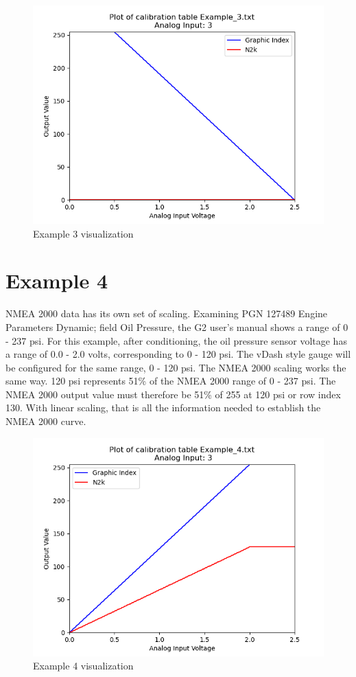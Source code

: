 \documentclass[12pt, letterpaper, twoside, titlepage]{article}
\begin{document}
\begin{figure}[hbt!]
  \includegraphics[width=\linewidth]{Example_3.txt.png}
  \centering
  \caption{Example 3 visualization}
  \label{fig:Example_3}
\end{figure}

\section{Example 4}
 NMEA 2000 data has its own set of scaling.  Examining PGN 127489 Engine Parameters Dynamic;  field Oil Pressure, the G2 user’s manual shows a range of 0 - 237 psi.  For this example,  after conditioning, the oil pressure sensor voltage has a range of 0.0 - 2.0 volts, corresponding to 0 - 120 psi.  The vDash style gauge will be configured for the same range, 0 - 120 psi. The NMEA 2000 scaling works the same way.  120 psi represents 51\% of the NMEA 2000 range of 0 - 237 psi.  The NMEA 2000 output value must therefore be 51\% of 255 at 120 psi or row index 130.  With linear scaling, that is all the information needed to establish the NMEA 2000 curve.
\begin{figure}[hbt!]
  \includegraphics[width=\linewidth]{Example_4.txt.png}
  \centering
  \caption{Example 4 visualization}
  \label{fig:Example_4}
\end{figure}
\end{document}
